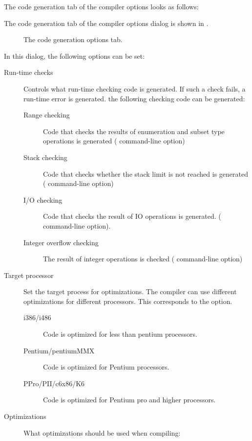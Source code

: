 \begin{htmlonly}
The code generation tab of the compiler options  looks as follows:
\end{htmlonly}
\begin{latexonly}
The code generation tab of the compiler options dialog is shown in
.
\begin{figure}[ht]
\begin{center}
\caption{The code generation options tab.}\label{fig:ocompb}
\ifpdf
{}
\else
{}
\fi
\end{center}
\end{figure}
\end{latexonly}
In this dialog, the following options can be set:
\begin{description}
\item[Run-time checks] Controls what run-time checking code is generated. If
such a check fails, a run-time error is generated.
the following checking code can be generated:
\begin{description}
\item[Range checking] Code that checks the results of enumeration and subset
type operations is generated ( command-line option)
\item[Stack checking] Code that checks whether the stack limit is not
reached is generated ( command-line option)
\item[I/O checking] Code that checks the result of IO operations is
generated. ( command-line option).
\item[Integer overflow checking] The result of integer operations is
checked ( command-line option)
\end{description}
\item[Target processor] Set the target process for optimizations. The
compiler can use different optimizations for different processors. This
corresponds to the  option.
\begin{description}
\item[i386/i486] Code is optimized for less than pentium processors.
\item[Pentium/pentiumMMX] Code is optimized for Pentium processors.
\item[PPro/PII/c6x86/K6] Code is optimized for Pentium pro and higher
processors.
\end{description}
\item[Optimizations] What optimizations should be used when compiling:

\end{description}
